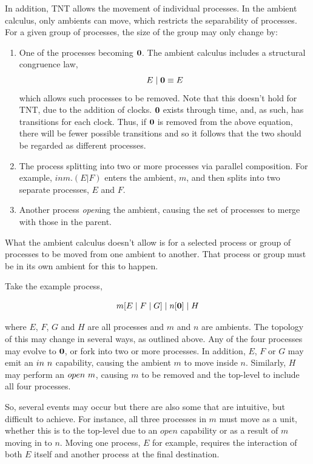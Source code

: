 In addition, TNT allows the movement of individual processes.  In the
ambient calculus, only ambients can move, which restricts the
separability of processes.  For a given group of processes, the
size of the group may only change by:

\begin{enumerate}
\item One of the processes becoming $\textbf{0}$.  The ambient calculus
      includes a structural congruence law,
\begin{equation}
E\;|\;\textbf{0} \equiv E
\end{equation}
      which allows such processes to be removed.  Note that this doesn't
      hold for TNT, due to the addition of clocks.  $\textbf{0}$ exists
      through time, and, as such, has transitions for each clock.  Thus,
      if $\textbf{0}$ is removed from the above equation, there will be fewer
      possible transitions and so it follows that the two should be
      regarded as different processes.
\item The process splitting into two or more processes via parallel
      composition.  For example, $in m.(E | F)$ enters the ambient, $m$,
      and then splits into two separate processes, $E$ and $F$.
\item Another process \emph{open}ing the ambient, causing the set of
      processes to merge with those in the parent.
\end{enumerate}

What the ambient calculus doesn't allow is for a selected process or
group of processes to be moved from one ambient to another.  That
process or group must be in its own ambient for this to happen.

Take the example process, 

\begin{equation}
m[E\;|\;F\;|\;G]\;|\;n[\textbf{0}]\;|\;H
\end{equation}

\noindent where $E$, $F$, $G$ and $H$ are all processes and $m$ and $n$
are ambients.  The topology of this may change in several ways, as
outlined above. Any of the four processes may evolve to $\textbf{0}$, or fork
into two or more processes.  In addition, $E$, $F$ or $G$ may emit an
$in\ n$ capability, causing the ambient $m$ to move inside $n$.
Similarly, $H$ may perform an $open\ m$, causing $m$ to be removed and
the top-level to include all four processes.

So, several events may occur but there are also some that are intuitive,
but difficult to achieve.  For instance, all three processes in $m$ must
move as a unit, whether this is to the top-level due to an $open$
capability or as a result of $m$ moving in to $n$.  Moving one process,
$E$ for example, requires the interaction of both $E$ itself and another
process at the final destination.

